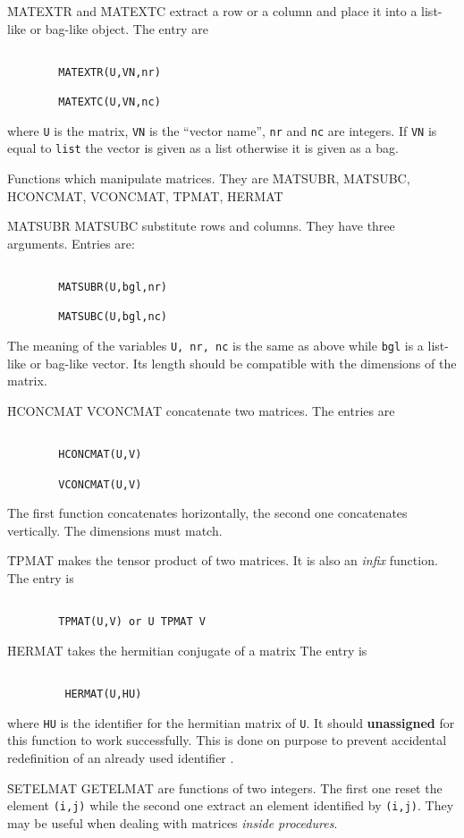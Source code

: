 \f{MATEXTR} and \f{MATEXTC} extract a row or a column and place it into
a list-like or bag-like object.
The entry are
\begin{verbatim}

        MATEXTR(U,VN,nr)

        MATEXTC(U,VN,nc)

\end{verbatim}
where \verb+U+ is the matrix,  \verb+VN+ is the ``vector name'',
\verb+nr+  and \verb+nc+ are integers.  If \verb+VN+  is equal
to {\tt list} the vector  is given  as a list otherwise  it is
given as a bag.
\item[iii.]
Functions which manipulate matrices. They are
\f{MATSUBR, MATSUBC, HCONCMAT, VCONCMAT, TPMAT, HERMAT}

\f{MATSUBR MATSUBC} substitute rows and columns. They have three arguments.
Entries are:
\begin{verbatim}

        MATSUBR(U,bgl,nr)

        MATSUBC(U,bgl,nc)

\end{verbatim}
The meaning of the variables \verb+U, nr, nc+ is the same as above
while \verb+bgl+ is a list-like or bag-like vector.
Its  length should be compatible with the dimensions of the matrix.

\f{HCONCMAT VCONCMAT} concatenate two matrices. The entries are
\begin{verbatim}

        HCONCMAT(U,V)

        VCONCMAT(U,V)

\end{verbatim}
The  first   function  concatenates  horizontally,   the   second  one
concatenates vertically. The dimensions must match.

\f{TPMAT} makes the tensor product of two matrices. It is also an
{\em infix} function. The entry is
\begin{verbatim}

        TPMAT(U,V) or U TPMAT V

\end{verbatim}
\f{HERMAT} takes the hermitian conjugate of a matrix
The entry is
\begin{verbatim}

         HERMAT(U,HU)

\end{verbatim}
where \verb+HU+ is the identifier for the hermitian matrix of \verb+U+.
It should {\bf unassigned} for this function to work  successfully.
This is done on  purpose to prevent accidental redefinition of an already
used identifier .
\item[iv.]
\f{SETELMAT GETELMAT} are functions of two integers. The first one
reset the element \verb+(i,j)+ while the second one extract an
element identified by \verb+(i,j)+. They may be useful when
dealing with matrices {\em inside procedures}.
\ei
%
%
%
%
%
%
%
%

